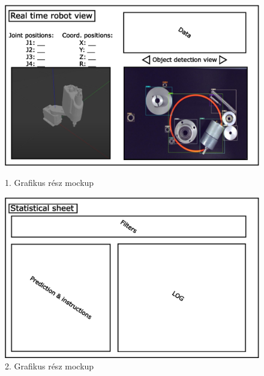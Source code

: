 \documentclass{article}
\begin{document}
\begin{figure}[h]
    \centering
    \includegraphics[scale = 0.8]{view_1.eps}
    \caption[]{1. Grafikus rész mockup}
    \vspace{10pt}
    \includegraphics[scale = 0.8]{view_2.eps}
    \caption[]{2. Grafikus rész mockup}
\end{figure}
\end{document}
